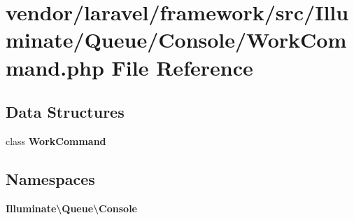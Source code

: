 \section{vendor/laravel/framework/src/\+Illuminate/\+Queue/\+Console/\+Work\+Command.php File Reference}
\label{_work_command_8php}
\subsection*{Data Structures}
\begin{DoxyCompactItemize}
\item 
class {\bf Work\+Command}
\end{DoxyCompactItemize}
\subsection*{Namespaces}
\begin{DoxyCompactItemize}
\item 
 {\bf Illuminate\textbackslash{}\+Queue\textbackslash{}\+Console}
\end{DoxyCompactItemize}
